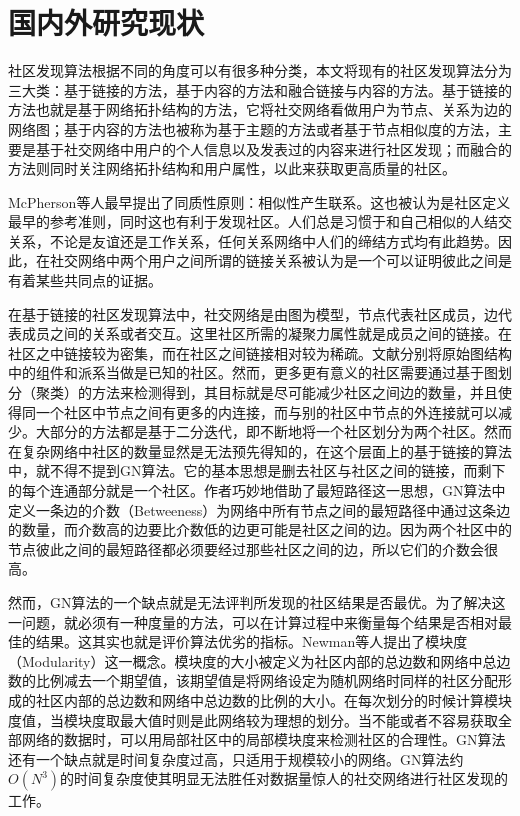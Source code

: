 \section{国内外研究现状}%
社区发现算法根据不同的角度可以有很多种分类，本文将现有的社区发现算法分为三大类：基于链接的方法，基于内容的方法和融合链接与内容的方法。基于链接的方法也就是基于网络拓扑结构的方法，它将社交网络看做用户为节点、关系为边的网络图；基于内容的方法也被称为基于主题的方法或者基于节点相似度的方法，主要是基于社交网络中用户的个人信息以及发表过的内容来进行社区发现；而融合的方法则同时关注网络拓扑结构和用户属性，以此来获取更高质量的社区。

McPherson等人最早提出了同质性原则：相似性产生联系\cite{Mcpherson2001Birds}。这也被认为是社区定义最早的参考准则，同时这也有利于发现社区。人们总是习惯于和自己相似的人结交关系，不论是友谊还是工作关系，任何关系网络中人们的缔结方式均有此趋势。因此，在社交网络中两个用户之间所谓的链接关系被认为是一个可以证明彼此之间是有着某些共同点的证据。

在基于链接的社区发现算法中，社交网络是由图为模型，节点代表社区成员，边代表成员之间的关系或者交互。这里社区所需的凝聚力属性就是成员之间的链接。在社区之中链接较为密集，而在社区之间链接相对较为稀疏。文献\cite{Fortunato2009Community}分别将原始图结构中的组件和派系当做是已知的社区。然而，更多更有意义的社区需要通过基于图划分（聚类）的方法来检测得到，其目标就是尽可能减少社区之间边的数量，并且使得同一个社区中节点之间有更多的内连接，而与别的社区中节点的外连接就可以减少。大部分的方法都是基于二分迭代，即不断地将一个社区划分为两个社区。然而在复杂网络中社区的数量显然是无法预先得知的，在这个层面上的基于链接的算法中，就不得不提到GN算法\cite{2002Community}。它的基本思想是删去社区与社区之间的链接，而剩下的每个连通部分就是一个社区。作者巧妙地借助了最短路径这一思想，GN算法中定义一条边的介数（Betweeness）为网络中所有节点之间的最短路径中通过这条边的数量，而介数高的边要比介数低的边更可能是社区之间的边。因为两个社区中的节点彼此之间的最短路径都必须要经过那些社区之间的边，所以它们的介数会很高。

然而，GN算法的一个缺点就是无法评判所发现的社区结果是否最优。为了解决这一问题，就必须有一种度量的方法，可以在计算过程中来衡量每个结果是否相对最佳的结果。这其实也就是评价算法优劣的指标。Newman等人提出了模块度（Modularity）\cite{NewmanFind}这一概念。模块度的大小被定义为社区内部的总边数和网络中总边数的比例减去一个期望值，该期望值是将网络设定为随机网络时同样的社区分配形成的社区内部的总边数和网络中总边数的比例的大小。在每次划分的时候计算模块度值，当模块度取最大值时则是此网络较为理想的划分。当不能或者不容易获取全部网络的数据时，可以用局部社区中的局部模块度来检测社区的合理性。GN算法还有一个缺点就是时间复杂度过高，只适用于规模较小的网络。GN算法约$O(N^3)$的时间复杂度使其明显无法胜任对数据量惊人的社交网络进行社区发现的工作。

